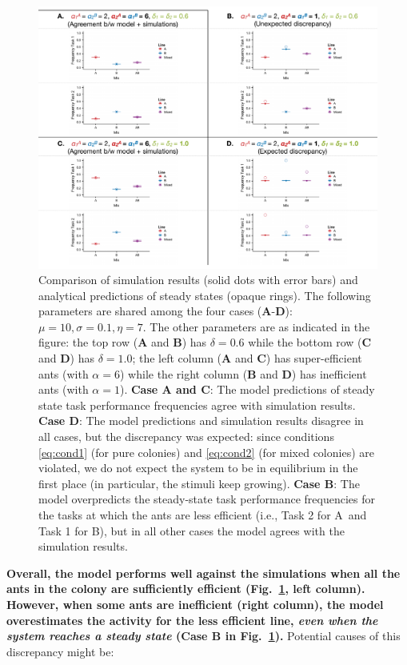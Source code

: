 \documentclass[10pt]{article}
\theoremstyle{remark}
\newcommand{\A}{{\color{red}A}}
\newcommand{\B}{{\color{blue}B}}
\begin{document}
\begin{figure}[H]
    \centering
    \includegraphics[trim={0 0.25in 0 0.2in}, clip, width=0.9\linewidth]{output/Task_dist/5050_comparison.pdf}
    \caption{Comparison of simulation results (solid dots with error bars) and analytical predictions of steady states (opaque rings). The following parameters are shared among the four cases (\textbf{A}-\textbf{D}): $\mu = 10, \sigma = 0.1, \eta = 7$. The other parameters are as indicated in the figure: the top row (\textbf{A} and \textbf{B}) has $\delta = 0.6$ while the bottom row (\textbf{C} and \textbf{D}) has $\delta = 1.0$; the left column (\textbf{A} and \textbf{C}) has super-efficient ants (with $\alpha = 6$) while the right column (\textbf{B} and \textbf{D}) has inefficient ants (with $\alpha = 1$). \textbf{Case A and C}: The model predictions of steady state task performance frequencies agree with simulation results. \textbf{Case D}: The model predictions and simulation results disagree in all cases, but the discrepancy was expected: since conditions \eqref{eq:cond1} (for pure colonies) and \eqref{eq:cond2} (for mixed colonies) are violated, we do not expect the system to be in equilibrium in the first place (in particular, the stimuli keep growing). \textbf{Case B}: The model overpredicts the steady-state task performance frequencies for the tasks at which the ants are less efficient (i.e., Task 2 for \A\ and Task 1 for \B), but in all other cases the model agrees with the simulation results.}
    \label{fig:5050_comp}
\end{figure}
\vspace{-5pt}
\textbf{Overall, the model performs well against the simulations when all the ants in the colony are sufficiently efficient (Fig.~\ref{fig:5050_comp}, left column). However, when some ants are inefficient (right column), the model overestimates the activity for the less efficient line, \textit{even when the system reaches a steady state} (\textbf{Case B} in Fig.~\ref{fig:5050_comp}).} Potential causes of this discrepancy might be:
\end{document}
